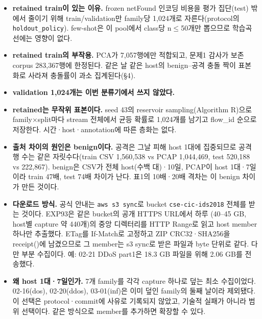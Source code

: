 \begin{itemize}
\item \textbf{retained train이 있는 이유.} frozen netFound 인코딩 비용을 평가 집단(test) 밖에서 줄이기 위해 train/validation만 family당 1,024개로 자른다(protocol의 \texttt{holdout\_policy}). few-shot은 이 pool에서 class당 n$\le$50개만 뽑으므로 학습곡선에는 영향이 없다.
\item \textbf{retained train의 부작용.} PCA가 7,057행에만 적합되고, 문제1 감사가 보존 corpus 283,367행에 한정된다. 같은 날 같은 host의 benign--공격 충돌 짝이 표본화로 사라져 충돌률이 과소 집계된다(\S4).
\item \textbf{validation 1,024개는 이번 분류기에서 쓰지 않았다.}
\item \textbf{retained는 무작위 표본이다.} seed 43의 reservoir sampling(Algorithm R)으로 family$\times$split마다 stream 전체에서 균등 확률로 1,024개를 남기고 flow\_id 순으로 저장한다. 시간·host·annotation에 따른 층화는 없다.
\item \textbf{출처 차이의 원인은 benign이다.} 공격은 그날 피해 host 1대에 집중되므로 공격 행 수는 같은 자릿수다(train CSV 1,560,538 vs PCAP 1,044,469, test 520,188 vs 222,867). benign은 CSV가 전체 host(수백 대)·10일, PCAP이 host 1대·7일이라 train 47배, test 74배 차이가 난다. 표1의 10배·20배 격차는 이 benign 차이가 만든 것이다.
\item \textbf{다운로드 방식.} 공식 안내는 \texttt{aws s3 sync}로 bucket \texttt{cse-cic-ids2018} 전체를 받는 것이다. EXP93은 같은 bucket의 공개 HTTPS URL에서 하루 (40--45 GB, host별 capture 약 440개)의 중앙 디렉터리를 HTTP Range로 읽고 host member 하나만 추출했다. ETag를 If-Match로 고정하고 ZIP CRC32·SHA256을 receipt()에 남겼으므로 그 member는 s3 sync로 받은 파일과 byte 단위로 같다. 다만 부분 수집이다. 예: 02-21 DDoS part1은 18.3 GB 파일을 위해 2.06 GB를 전송했다.
\item \textbf{왜 host 1대·7일인가.} 7개 family를 각각 capture 하나로 덮는 최소 수집이었다. 02-16(dos), 02-20(ddos), 03-01(inf)은 이미 덮인 family의 둘째 날이라 제외됐다. 이 선택은 protocol·commit에 사유로 기록되지 않았고, 기술적 실패가 아니라 범위 선택이다. 같은 방식으로 member를 추가하면 확장할 수 있다.
\end{itemize}

